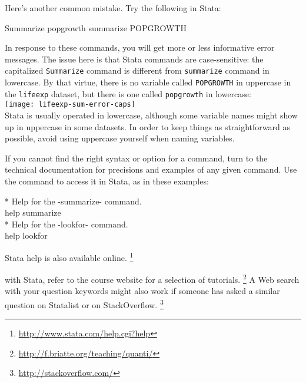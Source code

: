 \begin{description}
			Here's another common mistake. Try the following in Stata:%
			
			\begin{docspec}
				Summarize popgrowth
				summarize POPGROWTH
			\end{docspec}

			In response to these commands, you will get more or less informative error messages. The issue here is that Stata commands are case-sensitive: the capitalized \texttt{Summarize} command is different from \texttt{summarize} command in lowercase. By that virtue, there is no variable called \texttt{POPGROWTH} in uppercase in the \texttt{lifeexp} dataset, but there is one called \texttt{popgrowth} in lowercase:\\[1em]%

			\texttt{[image: lifeexp-sum-error-caps]}\\[1em]
			
			Stata is usually operated in lowercase, although some variable names might show up in uppercase in some datasets. In order to keep things as straightforward as possible, avoid using uppercase yourself when naming variables.%
			
			\item[\smallcaps{Using help files}]%
			If you cannot find the right syntax or option for a command, turn to the technical documentation for precisions and examples of any given command. Use the  command to access it in Stata, as in these examples:%
	
			\begin{docspec}
				* Help for the -summarize- command.\\
				help summarize\\[1em]
		
				* Help for the -lookfor- command.\\
				help lookfor
			\end{docspec}

			Stata help is also available online.%
				\footnote{\url{http://www.stata.com/help.cgi?help}} %
				
			 with Stata, refer to the course website for a selection of tutorials.%
				\footnote{\url{http://f.briatte.org/teaching/quanti/}} %
				A Web search with your question keywords might also work if someone has asked a similar question on Statalist or on StackOverflow.%
				\footnote{\url{http://stackoverflow.com/}}%


\end{description}
